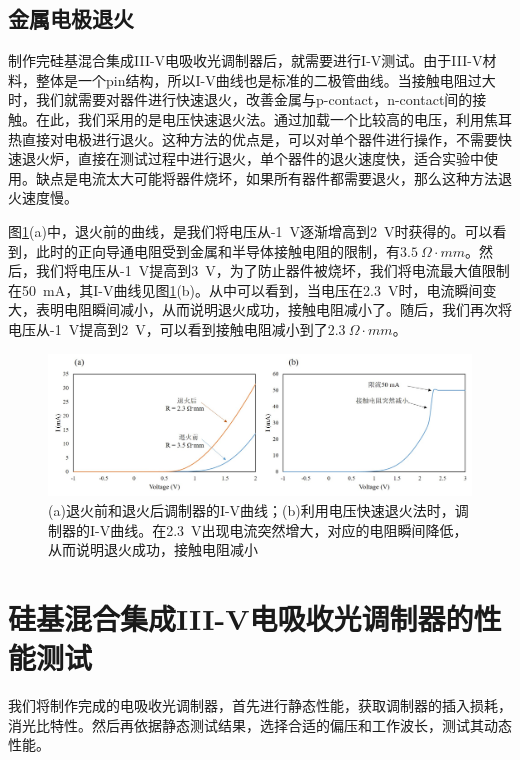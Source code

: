 \subsection{金属电极退火}
制作完硅基混合集成III-V电吸收光调制器后，就需要进行I-V测试。由于III-V材料，整体是一个pin结构，所以I-V曲线也是标准的二极管曲线。当接触电阻过大时，我们就需要对器件进行快速退火，改善金属与p-contact，n-contact间的接触。在此，我们采用的是电压快速退火法。通过加载一个比较高的电压，利用焦耳热直接对电极进行退火。这种方法的优点是，可以对单个器件进行操作，不需要快速退火炉，直接在测试过程中进行退火，单个器件的退火速度快，适合实验中使用。缺点是电流太大可能将器件烧坏，如果所有器件都需要退火，那么这种方法退火速度慢。

图\ref{chapt4_3D_resist}(a)中，退火前的曲线，是我们将电压从-1~V逐渐增高到2~V时获得的。可以看到，此时的正向导通电阻受到金属和半导体接触电阻的限制，有$3.5~ \Omega \cdot mm$。然后，我们将电压从-1~V提高到3~V，为了防止器件被烧坏，我们将电流最大值限制在50~mA，其I-V曲线见图\ref{chapt4_3D_resist}(b)。从中可以看到，当电压在2.3~V时，电流瞬间变大，表明电阻瞬间减小，从而说明退火成功，接触电阻减小了。随后，我们再次将电压从-1~V提高到2~V，可以看到接触电阻减小到了$2.3~ \Omega \cdot mm$。
\begin{figure}[htb]
	\centering
	\includegraphics[width=15cm]{./Pictures/chapt4_3D_resist.jpg}
	\caption{(a)退火前和退火后调制器的I-V曲线；(b)利用电压快速退火法时，调制器的I-V曲线。在2.3~V出现电流突然增大，对应的电阻瞬间降低，从而说明退火成功，接触电阻减小}
	\label{chapt4_3D_resist}
\end{figure}
\section{硅基混合集成III-V电吸收光调制器的性能测试}
我们将制作完成的电吸收光调制器，首先进行静态性能，获取调制器的插入损耗，消光比特性。然后再依据静态测试结果，选择合适的偏压和工作波长，测试其动态性能。
